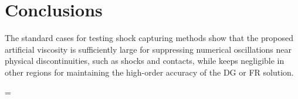 \documentclass[10pt]{article}
\begin{document}
\section{Conclusions}
The standard cases for testing shock capturing methods show that the proposed artificial viscosity is sufficiently large for suppressing numerical oscillations near physical discontinuities, such as shocks and contacts, while keeps negligible in other regions for maintaining the high-order accuracy of the DG or FR solution.

\bibspacing=


\end{document}
